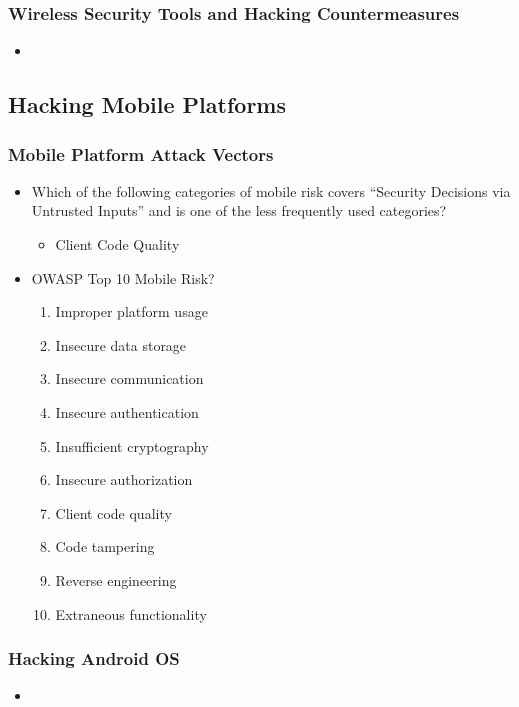 \subsubsection{Wireless Security Tools and Hacking Countermeasures}
\begin{itemize}
    \item 
\end{itemize}


\subsection{Hacking Mobile Platforms}
\subsubsection{Mobile Platform Attack Vectors}
\begin{itemize}
    \item Which of the following categories of mobile risk covers “Security Decisions via Untrusted Inputs” and is one of the less frequently used categories?
    \begin{itemize}
        \item Client Code Quality
    \end{itemize}
    \item OWASP Top 10 Mobile Risk?
    \begin{enumerate}
        \item Improper platform usage
        \item Insecure data storage
        \item Insecure communication
        \item Insecure authentication
        \item Insufficient cryptography
        \item Insecure authorization
        \item Client code quality
        \item Code tampering
        \item Reverse engineering
        \item Extraneous functionality
    \end{enumerate}    
\end{itemize}
\subsubsection{Hacking Android OS}
\begin{itemize}
    \item
\end{itemize}
